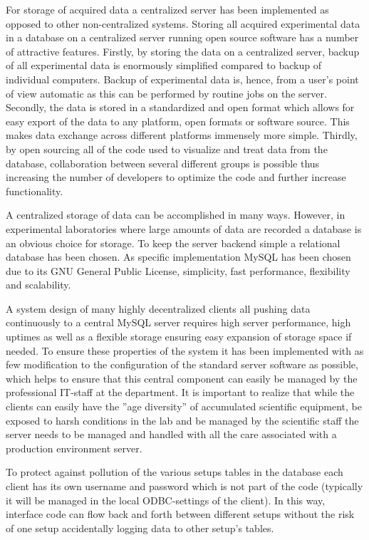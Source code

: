For storage of acquired data a centralized server has been implemented as
opposed to other non-centralized systems\cite{McIntosh2003}. Storing all
acquired experimental data in a database on a centralized server running open
source software has a number of attractive features. Firstly, by storing the
data on a centralized server, backup of all experimental data is enormously
simplified compared to backup of individual computers. Backup of experimental
data is, hence, from a user's point of view automatic as this can be performed
by routine jobs on the server. Secondly, the data is stored in a standardized
and open format which allows for easy export of the data to any platform, open
formats or software source. This makes data exchange across different platforms
immensely more simple. Thirdly, by open sourcing all of the code used to
visualize and treat data from the database, collaboration between several
different groups is possible thus increasing the number of developers to
optimize the code and further increase functionality.

A centralized storage of data can be accomplished in many ways. However, in
experimental laboratories where large amounts of data are recorded a database
is an obvious choice for storage. To keep the server backend simple a
relational database has been chosen. As specific implementation MySQL has been
chosen due to its GNU General Public License\cite{gpl}, simplicity, fast
performance, flexibility and scalability.

A system design of many highly decentralized clients all pushing data
continuously to a central MySQL server requires high server performance, high
uptimes as well as a flexible storage ensuring easy expansion of storage space
if needed. To ensure these properties of the system it has been implemented
with as few modification to the configuration of the standard server software
as possible, which helps to ensure that this central component can easily be
managed by the professional IT-staff at the department. It is important to
realize that while the clients can easily have the ''age diversity'' of
accumulated scientific equipment, be exposed to harsh conditions in the lab and
be managed by the scientific staff the server needs to be managed and handled
with all the care associated with a production environment server.

To protect against pollution of the various setups tables in the database each
client has its own username and password which is not part of the code
(typically it will be managed in the local ODBC-settings of the client). In
this way, interface code can flow back and forth between different setups
without the risk of one setup accidentally logging data to other setup's
tables.

